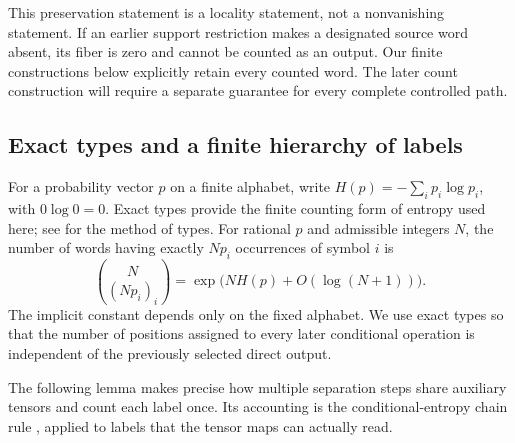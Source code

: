 This preservation statement is a locality statement, not a nonvanishing
statement.  If an earlier support restriction makes a designated source
word absent, its fiber is zero and cannot be counted as an output.  Our
finite constructions below explicitly retain every counted word.  The
later count construction will require a separate guarantee for every
complete controlled path.

\subsection{Exact types and a finite hierarchy of labels}
\label{alg:hierarchy-section}

For a probability vector \(p\) on a finite alphabet, write
\(H(p)=-\sum_i p_i\log p_i\), with \(0\log0=0\).
Exact types provide the finite counting form of entropy used here;
see \citet{csiszar1998} for the method of types.
For rational \(p\) and admissible integers \(N\), the number of words
having exactly \(Np_i\) occurrences of symbol \(i\) is
\begin{equation}
 \binom{N}{(Np_i)_i}
 =\exp\bigl(NH(p)+O(\log(N+1))\bigr).
 \label{alg:type-count}
\end{equation}
The implicit constant depends only on the fixed alphabet.  We use exact
types so that the number of positions assigned to every later conditional
operation is independent of the previously selected direct output.

The following lemma makes precise how multiple separation steps share
auxiliary tensors and count each label once.  Its accounting is the
conditional-entropy chain rule \citep{shannon1948}, applied to labels
that the tensor maps can actually read.

